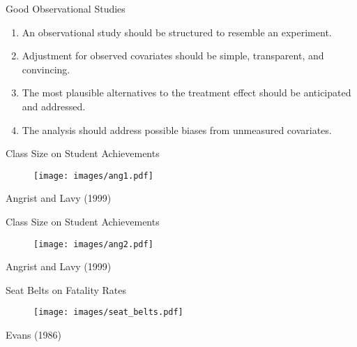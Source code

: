 \documentclass{beamer}
\numberwithin{equation}{section}
\begin{document}
\begin{frame}{Good Observational Studies}

\begin{enumerate}
\def\labelenumi{\arabic{enumi}.}
\itemsep1pt\parskip0pt
\item
  An observational study should be structured to resemble an experiment.\medskip
\item
  Adjustment for observed covariates should be simple, transparent, and
  convincing.\medskip
\item
  The most plausible alternatives to the treatment effect should be
  anticipated and addressed.\medskip
\item
  The analysis should address possible biases from unmeasured
  covariates.
\end{enumerate}

\end{frame}

\begin{frame}{Class Size on Student Achievements}

\begin{figure}[ht] \centering
    \texttt{[image: images/ang1.pdf]}
\end{figure}

Angrist and Lavy (1999)

\end{frame}

\begin{frame}{Class Size on Student Achievements}

\begin{figure}[ht] \centering
    \texttt{[image: images/ang2.pdf]}
\end{figure}

Angrist and Lavy (1999)

\end{frame}

\begin{frame}{Seat Belts on Fatality Rates}

\begin{figure}[ht] \centering
    \texttt{[image: images/seat\_belts.pdf]}
\end{figure}

Evans (1986)

\end{frame}
\end{document}
